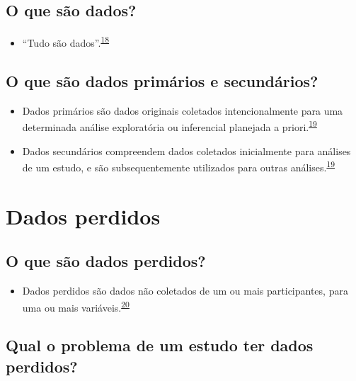 \documentclass[
]{book}
\providecommand{\tightlist}{%
  \setlength{\itemsep}{0pt}\setlength{\parskip}{0pt}}
\begin{document}
\hypertarget{o-que-suxe3o-dados}{%
\subsection{O que são dados?}\label{o-que-suxe3o-dados}}

\begin{itemize}
\tightlist
\item
  ``Tudo são dados''.\textsuperscript{\protect\hyperlink{ref-Olson2021}{18}}
\end{itemize}

\hypertarget{o-que-suxe3o-dados-primuxe1rios-e-secunduxe1rios}{%
\subsection{O que são dados primários e secundários?}\label{o-que-suxe3o-dados-primuxe1rios-e-secunduxe1rios}}

\begin{itemize}
\item
  Dados primários são dados originais coletados intencionalmente para uma determinada análise exploratória ou inferencial planejada a priori.\textsuperscript{\protect\hyperlink{ref-vetter2017}{19}}
\item
  Dados secundários compreendem dados coletados inicialmente para análises de um estudo, e são subsequentemente utilizados para outras análises.\textsuperscript{\protect\hyperlink{ref-vetter2017}{19}}
\end{itemize}

\hypertarget{dados-perdidos}{%
\section{Dados perdidos}\label{dados-perdidos}}

\hypertarget{o-que-suxe3o-dados-perdidos}{%
\subsection{O que são dados perdidos?}\label{o-que-suxe3o-dados-perdidos}}

\begin{itemize}
\tightlist
\item
  Dados perdidos são dados não coletados de um ou mais participantes, para uma ou mais variáveis.\textsuperscript{\protect\hyperlink{ref-Altman2007}{20}}
\end{itemize}

\hypertarget{qual-o-problema-de-um-estudo-ter-dados-perdidos}{%
\subsection{Qual o problema de um estudo ter dados perdidos?}\label{qual-o-problema-de-um-estudo-ter-dados-perdidos}}
\end{document}
